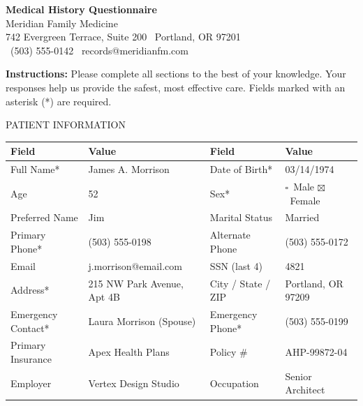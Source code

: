 \documentclass[11pt,letterpaper]{article}
\newcommand{\cb}{$\square$}
\newcommand{\cbx}{$\boxtimes$}
\begin{document}
\thispagestyle{fancy}

\begin{tcolorbox}[
  colback=white,
  colframe=medblue,
  boxrule=1.2pt,
  arc=0pt,
  outer arc=0pt,
  top=12pt,
  bottom=12pt,
  left=16pt,
  right=16pt,
  before skip=0pt,
  after skip=12pt
]
\begin{center}
  {\LARGE\bfseries\color{medblue}Medical History Questionnaire}\\[4pt]
  {\Large\color{medteal}Meridian Family Medicine}\\[5pt]
  {\small\color{meddark}%
    742 Evergreen Terrace, Suite 200 \textbar\ Portland, OR 97201\\
    \faPhone\ (503) 555-0142 \qquad \faEnvelope\ records@meridianfm.com}
\end{center}
\end{tcolorbox}

\begin{infobox}
\textbf{Instructions:} Please complete all sections to the best of your knowledge.
Your responses help us provide the safest, most effective care.
Fields marked with an asterisk (*) are required.
\end{infobox}

\begin{secbox}
PATIENT INFORMATION
\end{secbox}

\begin{tabularx}{\textwidth}{L{1.2in}L{2.35in}L{1.1in}L{1.75in}}
\toprule
{}
\textbf{Field} & \textbf{Value} & \textbf{Field} & \textbf{Value} \\
\midrule
Full Name* & James A. Morrison & Date of Birth* & 03/14/1974 \\
Age & 52 & Sex* & \cb\ Male \quad \cbx\ Female \\
Preferred Name & Jim & Marital Status & Married\\
Primary Phone* & (503) 555-0198 & Alternate Phone & (503) 555-0172 \\
Email & j.morrison@email.com & SSN (last 4) & 4821\\
Address* & 215 NW Park Avenue, Apt 4B & City / State / ZIP & Portland, OR 97209\\
Emergency Contact* & Laura Morrison (Spouse) & Emergency Phone* & (503) 555-0199\\
Primary Insurance & Apex Health Plans & Policy \# & AHP-99872-04\\
Employer & Vertex Design Studio & Occupation & Senior Architect\\
\bottomrule
\end{tabularx}
\end{document}
